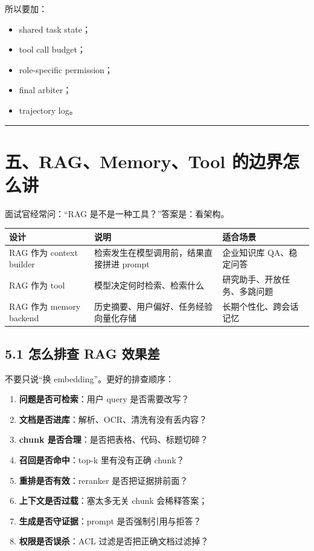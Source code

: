 所以要加：


\begin{itemize}[leftmargin=2em]
\item shared task state；
\item tool call budget；
\item role-specific permission；
\item final arbiter；
\item trajectory log。
\end{itemize}

\bigskip\hrule\bigskip

\section{五、RAG、Memory、Tool 的边界怎么讲}

面试官经常问：``RAG 是不是一种工具？''答案是：看架构。


\begingroup
\scriptsize
\setlength{\tabcolsep}{3pt}
\begin{longtable}{|p{}|p{}|p{}|}
\hline
设计 & 说明 & 适合场景 \\ \hline
RAG 作为 context builder & 检索发生在模型调用前，结果直接拼进 prompt & 企业知识库 QA、稳定问答 \\ \hline
RAG 作为 tool & 模型决定何时检索、检索什么 & 研究助手、开放任务、多跳问题 \\ \hline
RAG 作为 memory backend & 历史摘要、用户偏好、任务经验向量化存储 & 长期个性化、跨会话记忆 \\ \hline
\end{longtable}
\endgroup

\subsection{5.1 怎么排查 RAG 效果差}

不要只说``换 embedding''。更好的排查顺序：


\begin{enumerate}[leftmargin=2em]
\item \textbf{问题是否可检索}：用户 query 是否需要改写？
\item \textbf{文档是否进库}：解析、OCR、清洗有没有丢内容？
\item \textbf{chunk 是否合理}：是否把表格、代码、标题切碎？
\item \textbf{召回是否命中}：top-k 里有没有正确 chunk？
\item \textbf{重排是否有效}：reranker 是否把证据排前面？
\item \textbf{上下文是否过载}：塞太多无关 chunk 会稀释答案；
\item \textbf{生成是否守证据}：prompt 是否强制引用与拒答？
\item \textbf{权限是否误杀}：ACL 过滤是否把正确文档过滤掉？
\end{enumerate}

